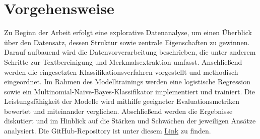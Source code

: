 \section{Vorgehensweise}
Zu Beginn der Arbeit erfolgt eine explorative Datenanalyse, um einen 
Überblick über den Datensatz, dessen Struktur sowie zentrale Eigenschaften zu 
gewinnen. Darauf aufbauend wird die Datenvorverarbeitung beschrieben, die unter 
anderem Schritte zur Textbereinigung und Merkmalsextraktion umfasst.
Anschließend werden die eingesetzten Klassifikationsverfahren vorgestellt und 
methodisch eingeordnet. Im Rahmen des Modelltrainings werden eine logistische 
Regression sowie ein Multinomial-Naive-Bayes-Klassifikator implementiert und 
trainiert.
Die Leistungsfähigkeit der Modelle wird mithilfe geeigneter Evaluationsmetriken 
bewertet und miteinander verglichen. Abschließend werden die Ergebnisse 
diskutiert und im Hinblick auf die Stärken und Schwächen der jeweiligen Ansätze 
analysiert. Die GitHub-Repository ist unter diesem
\href{https://github.com/thedawid999/Sentiment-Analysis}{Link}
zu finden.

